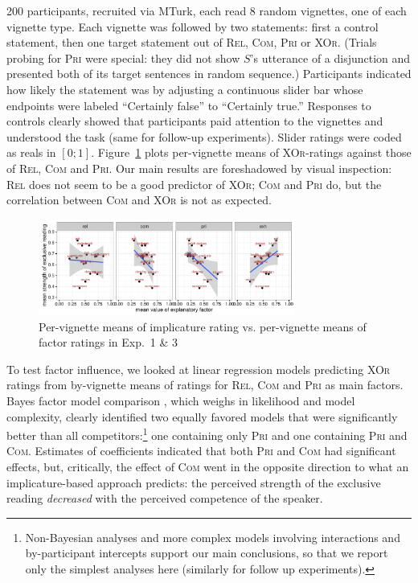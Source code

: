 \documentclass[12pt]{article}
\newcommand{\acro}[1]{\textsc{#1}\xspace}
\newcommand{\rel}{\acro{Rel}}
\newcommand{\com}{\acro{Com}}
\newcommand{\pri}{\acro{Pri}}
\newcommand{\xor}{\acro{XOr}}
\begin{document}
200 participants, recruited via MTurk, each read 8 random vignettes, one of each vignette
type. Each vignette was followed by two statements: first a control statement, then one target
statement out of \rel, \com, \pri or \xor. (Trials probing for \pri were special: they did not
show $S$'s utterance of a disjunction and presented both of its target sentences in random
sequence.) Participants indicated how likely the statement was by adjusting a continuous slider
bar whose endpoints were labeled ``Certainly false'' to ``Certainly true.'' Responses to
controls clearly showed that participants paid attention to the vignettes and understood the
task (same for follow-up experiments). Slider ratings were coded as reals in
$[0;1]$. Figure~\ref{fig:correlationsExp1} plots per-vignette means of \xor-ratings against
those of \rel, \com and \pri. Our main results are foreshadowed by visual inspection: \rel does
not seem to be a good predictor of \xor; \com and \pri do, but the correlation between \com and
\xor is not as expected.

\begin{figure}[tb]
  \centering

  \includegraphics[width = 0.75\textwidth]{../01_paper_draft/pics/correlationExp1and3.pdf}
  
  \caption{Per-vignette means of implicature rating vs. per-vignette means of factor ratings in
    Exp.~1 \& 3}
  \label{fig:correlationsExp1}
\end{figure}

To test factor influence, we looked at linear regression models predicting \xor ratings from
by-vignette means of ratings for \rel, \com and \pri as main factors. Bayes factor model
comparison \citep[e.g.][]{KassRaftery1995:Bayes-Factors}, which weighs in likelihood and model
complexity, clearly identified two equally favored models that were significantly better than
all competitors:\footnote{Non-Bayesian analyses and more complex models involving interactions
  and by-participant intercepts support our main conclusions, so that we report only the
  simplest analyses here (similarly for follow up experiments).} one containing only \pri and
one containing \pri and \com. Estimates of coefficients indicated that both \pri and \com had
significant effects, but, critically, the effect of \com went in the opposite direction to what
an implicature-based approach predicts: the perceived strength of the exclusive reading
\emph{decreased} with the perceived competence of the speaker.%
\end{document}

